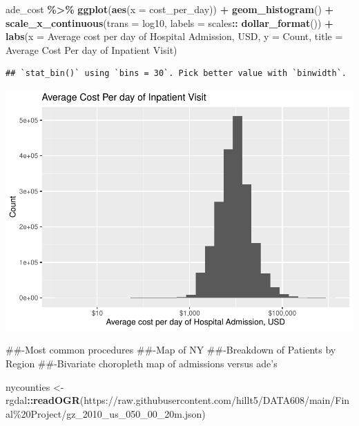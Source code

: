 \documentclass[preprint, 3p,
authoryear]{elsarticle} %
\newenvironment{Shaded}{\begin{snugshade}}{\end{snugshade}}
\newcommand{\DataTypeTok}[1]{\textcolor[rgb]{0.13,0.29,0.53}{#1}}
\newcommand{\KeywordTok}[1]{\textcolor[rgb]{0.13,0.29,0.53}{\textbf{#1}}}
\newcommand{\NormalTok}[1]{#1}
\newcommand{\OperatorTok}[1]{\textcolor[rgb]{0.81,0.36,0.00}{\textbf{#1}}}
\newcommand{\StringTok}[1]{\textcolor[rgb]{0.31,0.60,0.02}{#1}}
\begin{document}
\begin{Shaded}
\begin{Highlighting}[]
\NormalTok{ade\_cost }\OperatorTok{\%\textgreater{}\%}
\StringTok{  }\KeywordTok{ggplot}\NormalTok{(}\KeywordTok{aes}\NormalTok{(}\DataTypeTok{x =}\NormalTok{ cost\_per\_day)) }\OperatorTok{+}
\StringTok{  }\KeywordTok{geom\_histogram}\NormalTok{() }\OperatorTok{+}
\StringTok{  }\KeywordTok{scale\_x\_continuous}\NormalTok{(}\DataTypeTok{trans =} \StringTok{\textquotesingle{}log10\textquotesingle{}}\NormalTok{, }\DataTypeTok{labels =}\NormalTok{ scales}\OperatorTok{::}\StringTok{ }\KeywordTok{dollar\_format}\NormalTok{()) }\OperatorTok{+}
\StringTok{  }\KeywordTok{labs}\NormalTok{(}\DataTypeTok{x =} \StringTok{\textquotesingle{}Average cost per day of Hospital Admission, USD\textquotesingle{}}\NormalTok{, }\DataTypeTok{y =} \StringTok{\textquotesingle{}Count\textquotesingle{}}\NormalTok{, }\DataTypeTok{title =} \StringTok{\textquotesingle{}Average Cost Per day of Inpatient Visit\textquotesingle{}}\NormalTok{)}
\end{Highlighting}
\end{Shaded}

\begin{verbatim}
## `stat_bin()` using `bins = 30`. Pick better value with `binwidth`.
\end{verbatim}

\includegraphics{final-project-paper_files/figure-latex/cost-per-day-1.pdf}

\#\#-Most common procedures \#\#-Map of NY \#\#-Breakdown of Patients by
Region \#\#-Bivariate choropleth map of admissions versus ade's

\begin{Shaded}
\begin{Highlighting}[]
\NormalTok{nycounties \textless{}{-}}\StringTok{ }\NormalTok{rgdal}\OperatorTok{::}\KeywordTok{readOGR}\NormalTok{(}\StringTok{\textquotesingle{}https://raw.githubusercontent.com/hillt5/DATA608/main/Final\%20Project/gz\_2010\_us\_050\_00\_20m.json\textquotesingle{}}\NormalTok{)}
\end{Highlighting}
\end{Shaded}
\end{document}
